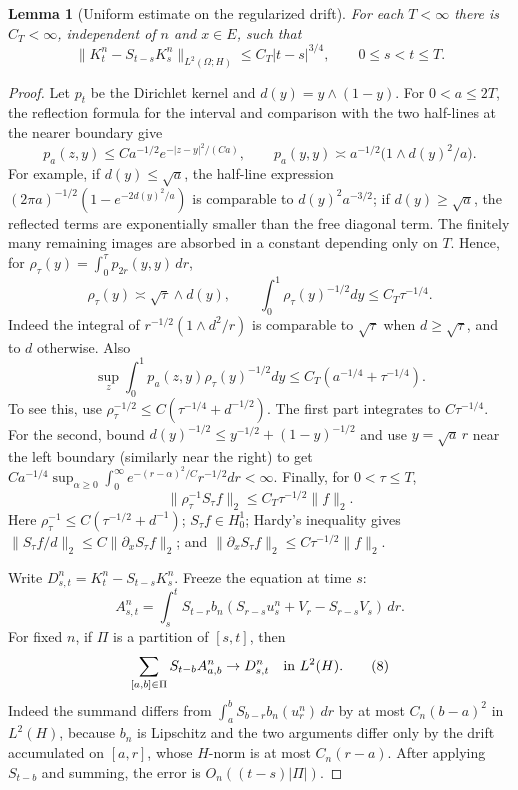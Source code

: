 \documentclass[12pt]{article}
\newtheorem{lemma}{Lemma}
\newcommand{\1}{\mathbf 1}
\begin{document}
\begin{lemma}[Uniform estimate on the regularized drift]\label{lem:Hestimate}
For each \(T<\infty\) there is \(C_T<\infty\), independent of \(n\) and
\(x\in E\), such that
\[
 \|K_t^n-S_{t-s}K_s^n\|_{L^2(\Omega;H)}
      \le C_T |t-s|^{3/4},\qquad 0\le s<t\le T .             \tag{2}
\]
\end{lemma}

\begin{proof}
Let \(p_t\) be the Dirichlet kernel and \(d(y)=y\wedge(1-y)\).  For
\(0<a\le 2T\), the reflection formula for the interval and comparison with
the two half-lines at the nearer boundary give
\[
p_a(z,y)\le Ca^{-1/2}e^{-|z-y|^2/(Ca)},\qquad
p_a(y,y)\asymp a^{-1/2}\bigl(1\wedge d(y)^2/a\bigr).          \tag{3}
\]
For example, if \(d(y)\le\sqrt a\), the half-line expression
\((2\pi a)^{-1/2}(1-e^{-2d(y)^2/a})\) is comparable to \(d(y)^2a^{-3/2}\);
if \(d(y)\ge\sqrt a\), the reflected terms are exponentially smaller than
the free diagonal term.  The finitely many remaining images are absorbed in a
constant depending only on \(T\).  Hence, for
\(\rho_\tau(y)=\int_0^\tau p_{2r}(y,y)\,dr\),
\[
        \rho_\tau(y)\asymp \sqrt{\tau}\wedge d(y),\qquad
        \int_0^1\rho_\tau(y)^{-1/2}dy\le C_T\tau^{-1/4}.      \tag{4}
\]
Indeed the integral of \(r^{-1/2}(1\wedge d^2/r)\) is comparable to
\(\sqrt\tau\) when \(d\ge\sqrt\tau\), and to \(d\) otherwise.  Also
\[
 \sup_z\int_0^1p_a(z,y)\rho_\tau(y)^{-1/2}dy
 \le C_T(a^{-1/4}+\tau^{-1/4}).                              \tag{5}
\]
To see this, use \(\rho_\tau^{-1/2}\le C(\tau^{-1/4}+d^{-1/2})\).  The first
part integrates to \(C\tau^{-1/4}\).  For the second, bound
\(d(y)^{-1/2}\le y^{-1/2}+(1-y)^{-1/2}\) and use
\(y=\sqrt a\,r\) near the left boundary (similarly near the right) to get
\(Ca^{-1/4}\sup_{\alpha\ge0}\int_0^\infty
e^{-(r-\alpha)^2/C}r^{-1/2}dr<\infty\).  Finally, for \(0<\tau\le T\),
\[
        \|\rho_\tau^{-1}S_\tau f\|_2\le C_T\tau^{-1/2}\|f\|_2. \tag{6}
\]
Here \(\rho_\tau^{-1}\le C(\tau^{-1/2}+d^{-1})\); \(S_\tau f\in H^1_0\);
Hardy's inequality gives \(\|S_\tau f/d\|_2\le C\|\partial_xS_\tau f\|_2\);
and \(\|\partial_xS_\tau f\|_2\le C\tau^{-1/2}\|f\|_2\).

Write \(D^n_{s,t}=K_t^n-S_{t-s}K_s^n\).  Freeze the equation at time \(s\):
\[
 A^n_{s,t}=\int_s^tS_{t-r}
 b_n\!\left(S_{r-s}u_s^n+V_r-S_{r-s}V_s\right)\,dr .          \tag{7}
\]
For fixed \(n\), if \(\Pi\) is a partition of \([s,t]\), then
\[
 \sum_{[a,b]\in\Pi}S_{t-b}A^n_{a,b}\to D^n_{s,t}\quad\hbox{in }L^2(H).
 \tag{8}
\]
Indeed the summand differs from
\(\int_a^bS_{b-r}b_n(u_r^n)\,dr\) by at most
\(C_n(b-a)^2\) in \(L^2(H)\), because \(b_n\) is Lipschitz and the two
arguments differ only by the drift accumulated on \([a,r]\), whose \(H\)-norm
is at most \(C_n(r-a)\).  After applying \(S_{t-b}\) and summing, the error is
\(O_n((t-s)|\Pi|)\).


\end{proof}
\end{document}
